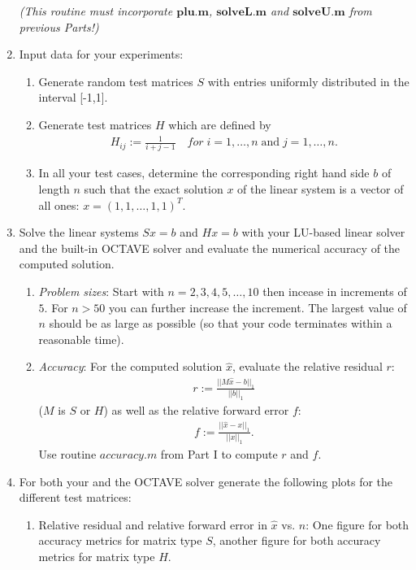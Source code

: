 \documentclass{scrartcl}
\begin{document}
\begin{enumerate}
\textit{(This routine must incorporate $\textbf{plu.m}$, $\textbf{solveL.m}$ and $\textbf{solveU.m}$ from previous Parts!)}        
        \item Input data for your experiments:
        \begin{enumerate}
            \item Generate random test matrices $S$ with entries uniformly distributed in the interval [-1,1].
            \item Generate test matrices $H$ which are defined by
            \begin{align*}
                H_{ij} := \frac{1}{i+j-1} \quad for \;i=1,\dots,n \; \mbox{and} \; j=1, \dots, n.
            \end{align*}
            \item In all your test cases, determine the corresponding right hand side $b$ of length $n$ such that the exact solution $x$ of the linear system is a vector of all ones: $x = (1, 1, \dots, 1, 1)^{T}$.
        \end{enumerate}
        \item Solve the linear systems $Sx = b$ and $Hx=b$ with your LU-based linear solver and the built-in OCTAVE solver and evaluate the numerical accuracy of the computed solution.
        \begin{enumerate}
            \item \textit{Problem sizes}: Start with $n=2,3,4,5,\dots,10$ then incease in increments of $5$. For $n > 50$ you can further increase the increment. The largest value of $n$ should be as large as possible (so that your code terminates within a reasonable time).
            \item \textit{Accuracy}: For the computed solution $\hat{x}$, evaluate the relative residual $r$:
            \begin{align*}
                r := \frac{||M\hat{x} - b||_1}{||b||_1}
            \end{align*}
            ($M$ is $S$ or $H$)
            as well as the relative forward error $f$:
            \begin{align*}
                f := \frac{||\hat{x} - x||_1}{||x||_1}. 
            \end{align*}
Use routine $accuracy.m$ from Part I to compute $r$ and $f$.
            
        \end{enumerate}

        \item For both your and the OCTAVE solver generate the following plots for the different test matrices:
            \begin{enumerate}
            \item Relative residual and relative forward error in $\hat{x}$ vs. $n$: One figure for both accuracy metrics for matrix type $S$, another figure for both accuracy metrics for matrix type $H$.
            \end{enumerate}


\end{enumerate}
\end{document}
